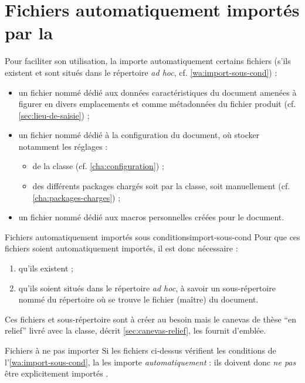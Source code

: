 \chapter{Fichiers automatiquement importés par la \yatcl{}}
\label{cha:fichiers-importes-par}

Pour faciliter son utilisation, la \yatcl{} importe automatiquement certains
fichiers (s'ils existent et sont situés dans le répertoire \emph{ad hoc},
cf. \vref{wa:import-sous-cond}) :
\begin{itemize}
\item un fichier nommé \file{\characteristicsfile} dédié aux données
  caractéristiques du document amenées à figurer en divers emplacements et
  comme métadonnées du fichier \pdf produit (cf. \vref{sec:lieu-de-saisie}) ;
\item un fichier nommé \file{\configurationfile} dédié à la configuration du
  document, où stocker notamment les réglages :
  \begin{itemize}
  \item de la classe \yatcl (cf. \vref{cha:configuration}) ;
  \item des différents packages chargés soit par la classe, soit manuellement
    (cf. \vref{cha:packages-charges}) ;
  \end{itemize}
\item un fichier nommé \file{\macrosfile} dédié aux macros personnelles créées
  pour le document.
\end{itemize}
\begin{dbwarning}{Fichiers automatiquement importés sous conditions}{import-sous-cond}
  Pour que ces fichiers soient automatiquement importés, il est donc
  nécessaire :
  \begin{enumerate}
  \item qu'ils existent ;
  \item qu'ils soient situés dans le répertoire \emph{ad hoc}, à savoir un
    sous-répertoire nommé \directory{\configurationdirectory} du répertoire où
    se trouve le fichier (maître) du document.
  \end{enumerate}
\end{dbwarning}
Ces fichiers et sous-répertoire sont à créer au besoin mais le canevas de thèse
\enquote{en relief} livré avec la classe, décrit \vref{sec:canevas-relief}, les
fournit d'emblée.
\begin{dbwarning}{Fichiers à ne pas importer}{}
  Si les fichiers ci-dessus vérifient les conditions de
  l'\vref{wa:import-sous-cond}, la \yatcl{} les importe
  \emph{automatiquement} : ils doivent donc \emph{ne pas} être explicitement
  importés .
\end{dbwarning}
